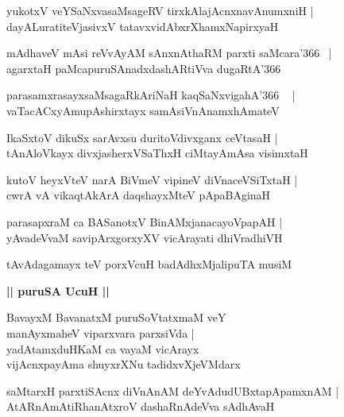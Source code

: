 \documentclass[twoside,12pt,openright]{book}
\newcounter{shloka}[chapter]
\def\uvaca#1{\centerline{{\large\textbf{#1}}}}
\begin{document}
\begin{shloka}%
yukotxV veYSaNxvasaMsageRV tirxkAlajAcnxnavAnumxniH |\\
dayALuratiteVjasivxV tatavxvidAbxrXhamxNapirxyaH
\end{shloka}

\begin{shloka}%
mAdhaveV mAsi reVvAyAM sAnxnAthaRM parxti saMcara\char'366 ~|\\
agarxtaH paMcapuruSAnadxdashARtiVva dugaRtA\char'366
\end{shloka}

\begin{shloka}%
parasamxrasayxsaMsagaRkAriNaH kaqSaNxvigahA\char'366  ~ |\\
vaTacACxyAmupAshirxtayx samAsiVnAnamxhAmateV
\end{shloka}

\begin{shloka}%
IkaSxtoV dikuSx sarAvxsu duritoVdivxganx ceVtasaH |\\
tAnAloVkayx divxjasherxVSaThxH ciMtayAmAsa visimxtaH 
\end{shloka}

\begin{shloka}%
kutoV heyxVteV narA BiVmeV vipineV diVnaceVSiTxtaH |\\
cwrA vA vikaqtAkArA daqshayxMteV pApaBAginaH 
\end{shloka}

\begin{shloka}%
parasapxraM ca BASanotxV BinAMxjanacayoVpapAH |\\
yAvadeVvaM savipArxgorxyXV vicArayati dhiVradhiVH 
\end{shloka}

\begin{shloka}%
tAvAdagamayx teV porxVcuH badAdhxMjalipuTA musiM
\end{shloka}

\uvaca{|| puruSA UcuH ||}

\begin{shloka}%
BavayxM BavanatxM puruSoVtatxmaM veY \\
manAyxmaheV viparxvara parxsiVda |\\
yadAtamxduHKaM ca vayaM vicArayx \\
vijAcnxpayAma shuyxrXNu tadidxvXjeVMdarx
\end{shloka}

\begin{shloka}%
saMtarxH parxtiSAcnx diVnAnAM deYvAdudUBxtapApamxnAM |\\
AtARnAmAtiRhanAtxroV dashaRnAdeVva sAdhAvaH 
\end{shloka}
\end{document}
